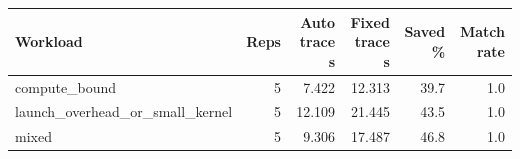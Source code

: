 \begin{tabular}{lrrrrr}
\hline
Workload & Reps & Auto trace s & Fixed trace s & Saved \% & Match rate \\
\hline
compute_bound & 5 & 7.422 & 12.313 & 39.7 & 1.0 \\
launch_overhead_or_small_kernel & 5 & 12.109 & 21.445 & 43.5 & 1.0 \\
mixed & 5 & 9.306 & 17.487 & 46.8 & 1.0 \\
\hline
\end{tabular}
